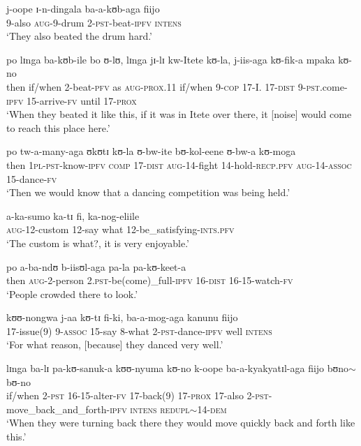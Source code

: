 \begin{exe}
\ex \gll j-oope ɪ-n-dingala ba-a-kʊb-aga fiijo\\
9-also \textsc{aug}-9-drum 2-\textsc{pst}-beat-\textsc{ipfv} \textsc{intens}\\
\glt \lq They also beated the drum hard.'

\ex \gll po lɪnga ba-kʊb-ile bo ʊ-lʊ, lɪnga jɪ-lɪ kw-Itete kʊ-la, j-iis-aga kʊ-fik-a mpaka kʊ-no\\
then if/when 2-beat-\textsc{pfv} as \textsc{aug}-\textsc{prox.11} if/when 9-\textsc{cop} 17-I. 17-\textsc{dist} 9-\textsc{pst}.come-\textsc{ipfv} 15-arrive-\textsc{fv} until 17-\textsc{prox}\\
\glt \lq When they beated it like this, if it was in Itete over there, it [noise] would come to reach this place here.'

\ex \gll po tw-a-many-aga ʊkʊtɪ kʊ-la ʊ-bw-ite bʊ-kol-eene ʊ-bw-a kʊ-moga\\
then \textsc{1pl}-\textsc{pst}-know-\textsc{ipfv} \textsc{comp} 17-\textsc{dist} \textsc{aug}-14-fight 14-hold-\textsc{recp.pfv} \textsc{aug}-14-\textsc{assoc} 15-dance-\textsc{fv}\\
\glt \lq Then we would know that a dancing competition was being held.'

\ex \gll a-ka-sumo ka-tɪ fi, ka-nog-eliile\\
\textsc{aug}-12-custom 12-say what 12-be\_satisfying-\textsc{ints.pfv}\\
\glt \lq The custom is what?, it is very enjoyable.'

\ex \gll po a-ba-ndʊ b-iisʊl-aga pa-la pa-kʊ-keet-a\\
then \textsc{aug}-2-person 2.\textsc{pst}-be(come)\_full-\textsc{ipfv} 16-\textsc{dist} 16-15-watch-\textsc{fv}\\
\glt \lq People crowded there to look.'

\ex \gll kʊʊ-nongwa j-aa kʊ-tɪ fi-ki, ba-a-mog-aga kanunu fiijo\\
17-issue(9) 9-\textsc{assoc} 15-say 8-what 2-\textsc{pst}-dance-\textsc{ipfv} well \textsc{intens}\\
\glt \lq For what reason, [because] they danced very well.'

\ex \gll lɪnga ba-lɪ pa-kʊ-sanuk-a kʊʊ-nyuma kʊ-no k-oope ba-a-kyakyatɪl-aga fiijo bʊno$\sim$bʊ-no\\
if/when 2-\textsc{pst} 16-15-alter-\textsc{fv} 17-back(9) 17-\textsc{prox} 17-also 2-\textsc{pst}-move\_back\_and\_forth-\textsc{ipfv} \textsc{intens} \textsc{redupl}$\sim$14-\textsc{dem}\\
\glt \lq When they were turning back there they would move quickly back and forth like this.'


\end{exe}
